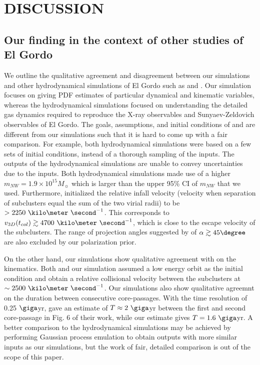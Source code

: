 \section{DISCUSSION}
\subsection{Our finding in the context of other studies of El Gordo}
We outline the qualitative agreement and disagreement between our
simulations and other hydrodynamical simulations of El Gordo such as
\cite{Donnert13} and \cite{Molnar14}. Our simulation focuses on giving PDF
estimates of particular dynamical and kinematic variables, whereas the
hydrodynamical simulations focused on understanding the detailed gas dynamics
required to reproduce the X-ray observables and Sunyaev-Zeldovich
observables of El Gordo. The goals,
assumptions, and initial conditions of \cite{Donnert13} and \cite{Molnar14}
are different from our simulations such that it is hard to come up with a
fair comparison. 
For example, both hydrodynamical simulations were based on a few sets of initial
conditions, instead of a thorough sampling of the inputs. The outputs of
the hydrodynamical simulations are unable to convey uncertainties due to
the inputs. Both hydrodynamical simulations made use of a higher $m_{NW} =
1.9 \times 10^{15} M_{\sun}$ which is larger than the upper 95\% CI of $m_{NW}$
that we used. Furthermore, \cite{Molnar14} initialized the relative infall velocity (velocity when separation of subclusters equal the sum
of the two virial radii) to be $> 2250~\kilo \meter~
\second^{-1}$. This corresponds to $v_{3D}(t_{col}) \gtrsim 4700~\kilo
\meter~\second^{-1}$, which is close to the escape velocity of the
subclusters. The range of projection angles suggested by
\cite{Molnar14} of $\alpha \gtrsim 45\degree$ are also excluded by our
polarization prior. \par 
On the other hand, our simulations show qualitative agreement with
\cite{Donnert13} on the kinematics. Both \cite{Donnert13} and our
simulation assumed a low energy orbit as the initial condition and obtain a
relative collisional velocity between the subclusters at $\sim
2500~\kilo\meter~\second^{-1}$. Our simulations also show qualitative
agreemnt on the duration between consecutive core-passages. With
the time resolution of 0.25 $\giga$yr, \cite{Donnert13} gave an
estimate of  $T\approx 2~\giga$yr between the first and second
core-passage in Fig. 6 of their work, while our estimate gives $T
= 1.6~\giga$yr.  A better comparison to the hydrodynamical simulations
may be achieved by performing Gaussian process emulation to obtain outputs
with more similar inputs as our simulations, but the work of fair, detailed
comparison is out of the scope of this paper. 


